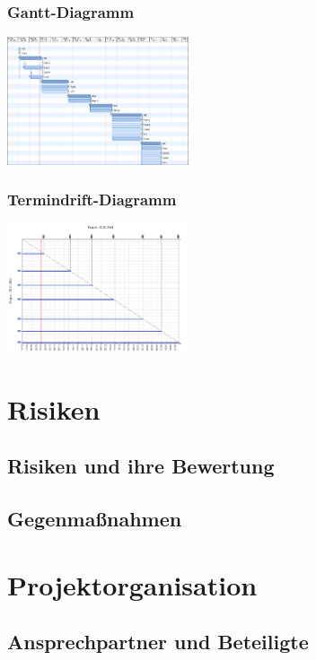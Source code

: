 \documentclass[11pt]{article}
\begin{document}
\subsubsection{Gantt-Diagramm}
\begin{center}
	\includegraphics[width=0.4\textwidth]{Gantt.png}
\end{center}
\subsubsection{Termindrift-Diagramm}
\begin{center}
	\includegraphics[width=0.4\textwidth]{TerminDrift.png}
\end{center}
\section{Risiken}

\subsection{Risiken und ihre Bewertung}

\subsection{Gegenmaßnahmen}

\section{Projektorganisation}

\subsection{Ansprechpartner und Beteiligte}
\end{document}
